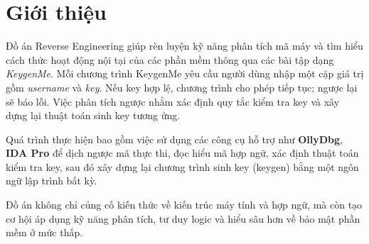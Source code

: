 \section{Giới thiệu}

Đồ án Reverse Engineering giúp rèn luyện kỹ năng phân tích mã máy và tìm hiểu cách thức hoạt động nội tại của các phần mềm thông qua các bài tập dạng \textit{KeygenMe}. Mỗi chương trình KeygenMe yêu cầu người dùng nhập một cặp giá trị gồm \textit{username} và \textit{key}. Nếu key hợp lệ, chương trình cho phép tiếp tục; ngược lại sẽ báo lỗi. Việc phân tích ngược nhằm xác định quy tắc kiểm tra key và xây dựng lại thuật toán sinh key tương ứng.

Quá trình thực hiện bao gồm việc sử dụng các công cụ hỗ trợ như \textbf{OllyDbg}, \textbf{IDA Pro} để dịch ngược mã thực thi, đọc hiểu mã hợp ngữ, xác định thuật toán kiểm tra key, sau đó xây dựng lại chương trình sinh key (keygen) bằng một ngôn ngữ lập trình bất kỳ.

Đồ án không chỉ củng cố kiến thức về kiến trúc máy tính và hợp ngữ, mà còn tạo cơ hội áp dụng kỹ năng phân tích, tư duy logic và hiểu sâu hơn về bảo mật phần mềm ở mức thấp.

\newpage